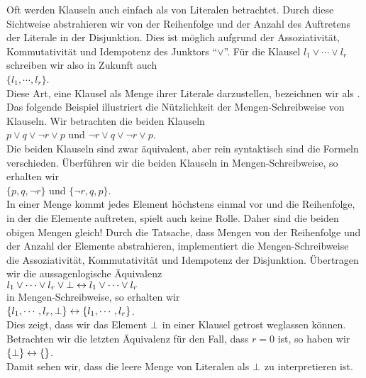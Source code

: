Oft werden Klauseln auch einfach als  von Literalen betrachtet.  
Durch diese Sichtweise abstrahieren wir von der Reihenfolge und der Anzahl des Auftretens
der Literale in der Disjunktion.  Dies ist möglich aufgrund der Assoziativität, Kommutativität und
Idempotenz des Junktors ``$\vee$''.  Für die Klausel $l_1 \vee \cdots \vee l_r$ schreiben
wir also in Zukunft auch 
\\[0.2cm]
\hspace*{1.3cm} $\{ l_1, \cdots, l_r \}$.
\\[0.2cm]
Diese Art, eine Klausel als Menge ihrer Literale darzustellen, bezeichnen wir als
.  
Das folgende Beispiel illustriert die Nützlichkeit der Mengen-Schreibweise von Klauseln.
Wir betrachten die beiden Klauseln
\\[0.2cm]
\hspace*{1.3cm}
$p \vee q \vee \neg r \vee p$ \quad und \quad $\neg r \vee q \vee \neg r \vee p$. 
\\[0.2cm]
Die beiden Klauseln sind zwar äquivalent, aber rein syntaktisch sind die Formeln verschieden.
Überführen wir die beiden Klauseln in Mengen-Schreibweise, so erhalten wir
\\[0.2cm]
\hspace*{1.3cm}
$\{p, q, \neg r \}$ \quad und \quad $\{ \neg r, q, p \}$. 
\\[0.2cm]
In einer Menge kommt jedes Element höchstens einmal vor und die Reihenfolge, in der die
Elemente auftreten, spielt auch keine Rolle.  Daher sind die beiden obigen Mengen gleich!
Durch die Tatsache, dass Mengen von der Reihenfolge und der Anzahl der Elemente
abstrahieren, implementiert die Mengen-Schreibweise die Assoziativität, Kommutativität und
Idempotenz der Disjunktion.  Über\-tragen wir die  aussagenlogische Äquivalenz
\\[0.2cm]
\hspace*{1.3cm}
$l_1 \vee \cdots \vee l_r \vee \bot \leftrightarrow l_1 \vee \cdots \vee l_r$
\\[0.2cm]
in Mengen-Schreibweise, so erhalten wir
\\[0.2cm]
\hspace*{1.3cm}
$\{ l_1, \cdots, l_r, \bot \} \leftrightarrow \{ l_1, \cdots, l_r \}$.
\\[0.2cm]
Dies zeigt, dass wir das Element $\bot$ in einer Klausel getrost weglassen können.
Betrachten wir die letzten Äquivalenz für den Fall, dass $r=0$ ist, so haben wir
\\[0.2cm]
\hspace*{1.3cm}
$\{\bot \} \leftrightarrow \{\}$.
\\[0.2cm]
Damit sehen wir, dass die leere Menge von Literalen als $\bot$ zu interpretieren ist.

